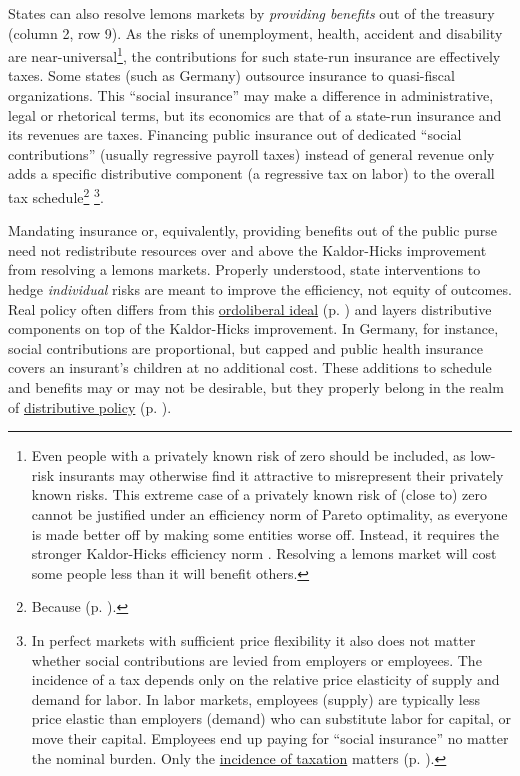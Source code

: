 States can also resolve lemons markets by \emph{providing benefits} out of the treasury (column 2, row 9). As the risks of unemployment, health, accident and disability are near-universal\footnote{
	Even people with a privately known risk of zero should be included, as low-risk insurants may otherwise find it attractive to misrepresent their privately known risks. This extreme case of a privately known risk of (close to) zero cannot be justified under an efficiency norm of Pareto optimality, as everyone is made better off by making some entities worse off. Instead, it requires the stronger Kaldor-Hicks efficiency norm \citep{Kaldor1939,Hicks1939}. Resolving a lemons market will cost some people less than it will benefit others.}, 
the contributions for such state-run insurance are effectively taxes. Some states (such as Germany) outsource insurance to quasi-fiscal organizations. This ``social insurance'' may make a difference in administrative, legal or rhetorical terms, but its economics are that of a state-run insurance and its revenues are taxes. Financing public insurance out of dedicated ``social contributions'' (usually regressive payroll taxes) instead of general revenue only adds a specific distributive component (a regressive tax on labor) to the overall tax schedule\footnote{
	Because  (p. \pageref{sec:redistribution-and-revenue-are-one}).}
\footnote{
	In perfect markets with sufficient price flexibility it also does not matter whether social contributions are levied from employers or employees. The incidence of a tax depends only on the relative price elasticity of supply and demand for labor. In labor markets, employees (supply) are typically less price elastic than employers (demand) who can substitute labor for capital, or move their capital. Employees end up paying for ``social insurance'' no matter the nominal burden. Only the \hyperref[sec:well-determined-incidence]{incidence of taxation} matters (p.  \pageref{sec:well-determinedincidence}).}.
	
Mandating insurance or, equivalently, providing benefits out of the public purse need not redistribute resources over and above the Kaldor-Hicks improvement from resolving a lemons markets. Properly understood, state interventions to hedge \emph{individual} risks are meant to improve the efficiency, not equity of outcomes. Real policy often differs from this \hyperref[sec:ordoliberalhygiene]{ordoliberal ideal} (p. \pageref{sec:ordoliberalhygiene}) and layers distributive components on top of the Kaldor-Hicks improvement. In Germany, for instance, social contributions are proportional, but capped and public health insurance covers an insurant's children at no additional cost. These additions to schedule and benefits may or may not be desirable, but they properly belong in the realm of \hyperref[sec:distribution]{distributive policy} (p. \pageref{sec:distribution}).

